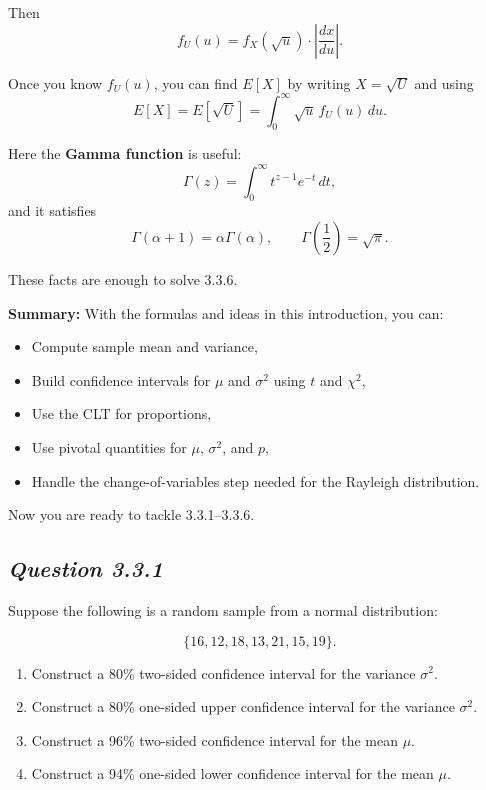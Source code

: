\documentclass[11pt,letterpaper]{article}
\theoremstyle{remark}
\begin{document}
Then
\[
f_U(u) = f_X(\sqrt{u}) \cdot \left|\frac{dx}{du}\right|.
\]

Once you know $f_U(u)$, you can find $E[X]$ by writing $X = \sqrt{U}$ and using
\[
E[X] = E[\sqrt{U}] = \int_0^\infty \sqrt{u}\, f_U(u)\,du.
\]

Here the \textbf{Gamma function} is useful:
\[
\Gamma(z) = \int_0^\infty t^{z-1}e^{-t}\,dt,
\]
and it satisfies
\[
\Gamma(\alpha+1) = \alpha \Gamma(\alpha), \qquad \Gamma\left(\frac{1}{2}\right) = \sqrt{\pi}.
\]

These facts are enough to solve 3.3.6.

\bigskip

\noindent
\textbf{Summary:}
With the formulas and ideas in this introduction, you can:
\begin{itemize}
    \item Compute sample mean and variance,
    \item Build confidence intervals for $\mu$ and $\sigma^2$ using $t$ and $\chi^2$,
    \item Use the CLT for proportions,
    \item Use pivotal quantities for $\mu$, $\sigma^2$, and $p$,
    \item Handle the change-of-variables step needed for the Rayleigh distribution.
\end{itemize}
Now you are ready to tackle 3.3.1--3.3.6.

\newpage

\subsection*{\textbf{\textit{Question 3.3.1}}}

Suppose the following is a random sample from a normal distribution:

\[
\{16, 12, 18, 13, 21, 15, 19\}.
\]

\begin{enumerate}
    \item[(a)] Construct a 80\% two-sided confidence interval for the variance $\sigma^2$.
    \item[(b)] Construct a 80\% one-sided upper confidence interval for the variance $\sigma^2$.
    \item[(c)] Construct a 96\% two-sided confidence interval for the mean $\mu$.
    \item[(d)] Construct a 94\% one-sided lower confidence interval for the mean $\mu$.
\end{enumerate}
\end{document}
